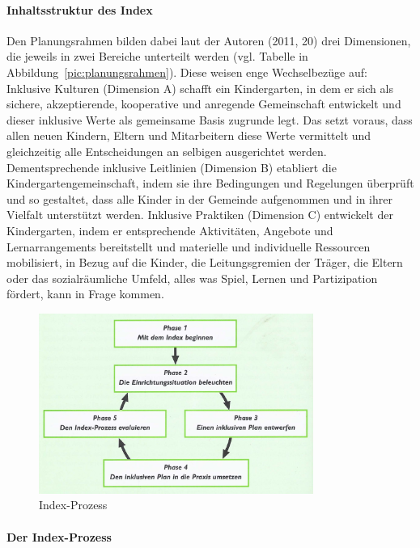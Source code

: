 \paragraph{Inhaltsstruktur des Index} Den Planungsrahmen bilden dabei laut der Autoren (2011, 20) drei Dimensionen, die jeweils in zwei Bereiche unterteilt werden (vgl. Tabelle in Abbildung~\ref{pic:planungsrahmen}). 
Diese weisen enge Wechselbezüge auf: Inklusive Kulturen (Dimension A) schafft ein Kindergarten, in dem er sich als sichere, akzeptierende, kooperative und anregende Gemeinschaft entwickelt und dieser inklusive Werte als gemeinsame Basis zugrunde legt. Das setzt voraus, dass allen neuen Kindern, Eltern und Mitarbeitern diese Werte vermittelt und gleichzeitig alle Entscheidungen an selbigen ausgerichtet werden.  
Dementsprechende inklusive Leitlinien (Dimension B) etabliert die Kindergartengemeinschaft, indem sie ihre Bedingungen und Regelungen überprüft und so gestaltet, dass alle Kinder in der Gemeinde aufgenommen und in ihrer Vielfalt unterstützt werden. Inklusive Praktiken (Dimension C) entwickelt der Kindergarten, indem er entsprechende Aktivitäten, Angebote und Lernarrangements bereitstellt und materielle und individuelle Ressourcen mobilisiert, in Bezug auf  die Kinder, die Leitungsgremien der Träger, die Eltern oder das sozialräumliche Umfeld, alles was Spiel, Lernen und Partizipation fördert, kann in Frage kommen.   

\begin{figure}
  \centering
  \label{pic:indexProzess}
  \includegraphics[width=0.8\textwidth]{bilder/indexProzess}
  \caption{Index-Prozess}
\end{figure}

\paragraph{Der Index-Prozess}

